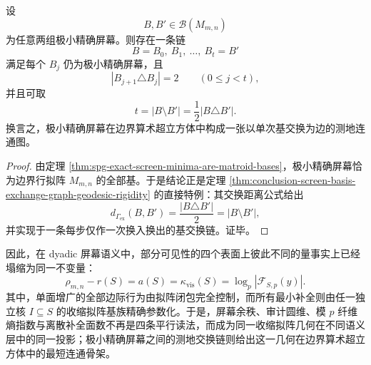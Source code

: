 \begin{corollary}[极小精确屏幕的测地交换性]\label{cor:conclusion-screen-minimal-exact-bases-geodesic-exchange}
设
\[
B,B'\in \mathcal B(M_{m,n})
\]
为任意两组极小精确屏幕。则存在一条链
\[
B=B_0,\ B_1,\ \dots,\ B_t=B'
\]
满足每个 \(B_j\) 仍为极小精确屏幕，且
\[
|B_{j+1}\triangle B_j|=2
\qquad
(0\le j<t),
\]
并且可取
\[
t=|B\setminus B'|=\frac12|B\triangle B'|.
\]
换言之，极小精确屏幕在边界算术超立方体中构成一张以单次基交换为边的测地连通图。
\end{corollary}
\begin{proof}
由定理 \ref{thm:spg-exact-screen-minima-are-matroid-bases}，极小精确屏幕恰为边界行拟阵 \(M_{m,n}\) 的全部基。于是结论正是定理 \ref{thm:conclusion-screen-basis-exchange-graph-geodesic-rigidity} 的直接特例：其交换距离公式给出
\[
d_{\Gamma_{\mathrm{ex}}}(B,B')
=
\frac{|B\triangle B'|}{2}
=
|B\setminus B'|,
\]
并实现于一条每步仅作一次换入换出的基交换链。证毕。
\end{proof}

\noindent
因此，在 dyadic 屏幕语义中，部分可见性的四个表面上彼此不同的量事实上已经塌缩为同一不变量：
\[
\rho_{m,n}-r(S)
=
a(S)
=
\kappa_{\mathrm{vis}}(S)
=
\log_p |\mathcal F_{S,p}(y)|.
\]
其中，单面增广的全部边际行为由拟阵闭包完全控制，而所有最小补全则由任一独立核 \(I\subseteq S\) 的收缩拟阵基族精确参数化。于是，屏幕余秩、审计圆维、模 \(p\) 纤维熵指数与离散补全面数不再是四条平行读法，而成为同一收缩拟阵几何在不同语义层中的同一投影；极小精确屏幕之间的测地交换链则给出这一几何在边界算术超立方体中的最短连通骨架。
